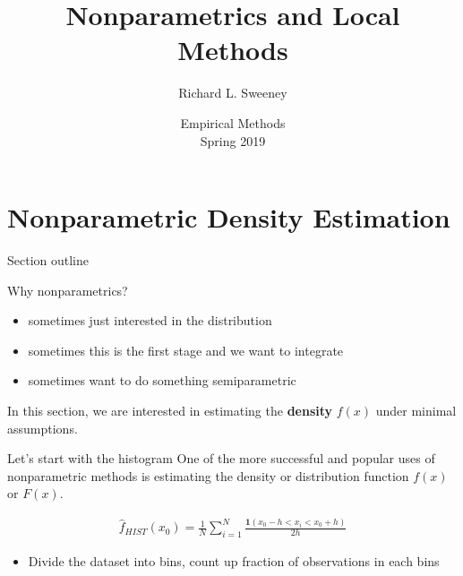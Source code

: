 

\setlength{\parskip}{5pt} 
\usepackage{hyperref}

\title [Non-parametrics]{Nonparametrics and Local Methods}
\author{Richard L. Sweeney}
\date{Empirical Methods \\ Spring 2019}




\begin{frame}
\titlepage
\end{frame}

\begin{frame}
  \tableofcontents  
\end{frame}

\section[Density Estimation]{Nonparametric Density Estimation}

\begin{frame}{Section outline}

Why nonparametrics?
\begin{itemize}
  \item sometimes just interested in the distribution %
  \item sometimes this is the first stage and we want to integrate
  \item sometimes want to do something semiparametric 
\end{itemize}

In this section, we are interested in estimating the \textbf{density} $f(x)$ under minimal assumptions. 

\end{frame}

\begin{frame}{Let's start with the histogram}
  One of the more successful and popular uses of nonparametric methods is estimating the density or distribution function $f(x)$ or $F(x)$.
  
  \begin{eqnarray*}
    \hat{f}_{HIST}(x_0) = \frac{1}{N} \sum_{i=1}^N \frac{\mathbf{1}(x_0 - h < x_i < x_0 + h)}{2 h}
  \end{eqnarray*}
    
  \begin{itemize}
  \item Divide the dataset into bins, count up fraction of observations in each bins
  \end{itemize}
\end{frame}
 

